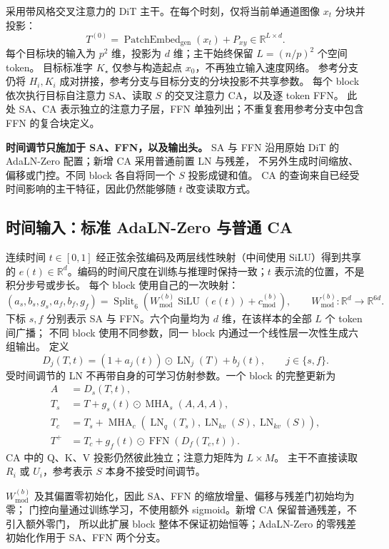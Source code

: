 \documentclass[UTF8,fontset=fandol,zihao=5,a4paper]{ctexart}
\newcommand{\R}{\mathbb R}
\newcommand{\LN}{\operatorname{LN}}
\newcommand{\FFN}{\operatorname{FFN}}
\newcommand{\MHA}{\operatorname{MHA}}
\begin{document}
采用带风格交叉注意力的 DiT 主干。在每个时刻，仅将当前单通道图像 $x_t$ 分块并投影：
\[
T^{(0)}=\operatorname{PatchEmbed}_{\mathrm{gen}}(x_t)+P_{xy}
\in\R^{L\times d}.
\]
每个目标块的输入为 $p^2$ 维，投影为 $d$ 维；主干始终保留 $L=(n/p)^2$ 个空间 token。
目标标准字 $K_\star$ 仅参与构造起点 $x_0$，不再独立输入速度网络。
参考分支仍将 $H_i,K_i$ 成对拼接，参考分支与目标分支的分块投影不共享参数。
每个 block 依次执行目标自注意力 SA、读取 $S$ 的交叉注意力 CA，以及逐 token FFN。
此处 SA、CA 表示独立的注意力子层，FFN 单独列出；不重复套用参考分支中包含 FFN 的复合块定义。

\textbf{时间调节只施加于 SA、FFN，以及输出头。}
SA 与 FFN 沿用原始 DiT 的 AdaLN-Zero 配置；新增 CA 采用普通前置 LN 与残差，
不另外生成时间缩放、偏移或门控。不同 block 各自将同一个 $S$ 投影成键和值。
CA 的查询来自已经受时间影响的主干特征，因此仍然能够随 $t$ 改变读取方式。

\subsection{时间输入：标准 AdaLN-Zero 与普通 CA}

连续时间 $t\in[0,1]$ 经正弦余弦编码及两层线性映射（中间使用 SiLU）得到共享的
$e(t)\in\R^d$。编码的时间尺度在训练与推理时保持一致；$t$ 表示流的位置，不是积分步号或步长。
每个 block 使用自己的一次映射：
\[
(a_s,b_s,g_s,a_f,b_f,g_f)
=\operatorname{Split}_6\!\left(
W_{\mathrm{mod}}^{(b)}\operatorname{SiLU}(e(t))+c_{\mathrm{mod}}^{(b)}
\right),
\qquad W_{\mathrm{mod}}^{(b)}:\R^d\to\R^{6d}.
\]
下标 $s,f$ 分别表示 SA 与 FFN。六个向量均为 $d$ 维，在该样本的全部 $L$ 个 token 间广播；
不同 block 使用不同参数，同一 block 内通过一个线性层一次性生成六组输出。
定义
\[
D_j(T,t)=(1+a_j(t))\odot\LN_j(T)+b_j(t),\qquad j\in\{s,f\}.
\]
受时间调节的 LN 不再带自身的可学习仿射参数。一个 block 的完整更新为
\begin{align*}
A &= D_s(T,t),\\
T_s &= T+g_s(t)\odot\MHA_s(A,A,A),\\
T_c &= T_s+\MHA_c\!\left(\LN_q(T_s),\LN_{kv}(S),\LN_{kv}(S)\right),\\
T^+ &= T_c+g_f(t)\odot\FFN\!\left(D_f(T_c,t)\right).
\end{align*}
CA 中的 Q、K、V 投影仍然彼此独立；注意力矩阵为 $L\times M$。
主干不直接读取 $R_i$ 或 $U_i$，参考表示 $S$ 本身不接受时间调节。

$W_{\mathrm{mod}}^{(b)}$ 及其偏置零初始化，因此 SA、FFN 的缩放增量、偏移与残差门初始均为零；
门控向量通过训练学习，不使用额外 sigmoid。新增 CA 保留普通残差，不引入额外零门，
所以此扩展 block 整体不保证初始恒等；AdaLN-Zero 的零残差初始化作用于 SA、FFN 两个分支。
\end{document}
